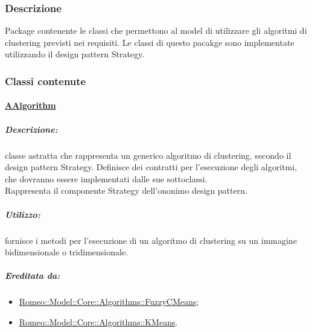 		\subsubsection{Descrizione}
		Package\g{} contenente le classi che permettono al model di utilizzare gli algoritmi di clustering\g{} previsti nei requisiti.	
		Le classi di questo pacakge\g{} sono implementate utilizzando il design pattern\g{} Strategy.	
		
		
		\subsubsection{Classi contenute}
		\paragraph{\underline{AAlgorithm}}
		\label{algorithms::algorithms} 
		
			\subparagraph{Descrizione:} classe astratta che rappresenta un generico algoritmo di clustering\g{}, secondo il design pattern\g{} Strategy. Definisce dei contratti per l’esecuzione degli algoritmi, che dovranno essere implementati dalle sue sottoclassi.
			\\Rappresenta il componente Strategy dell'ononimo design pattern\g{}.
			
			\subparagraph{Utilizzo:} fornisce i metodi per l’esecuzione di un algoritmo di clustering\g{} su un immagine bidimensionale o tridimensionale.
			
			\subparagraph{Ereditata da:}
				\begin{itemize}
					\item \hyperref[algorithms:fuzzycmeans]{Romeo::Model::Core::Algorithms::FuzzyCMeans};
					\item \hyperref[algorithms::kmeans]{Romeo::Model::Core::Algorithms::KMeans}.
				\end{itemize}
				

